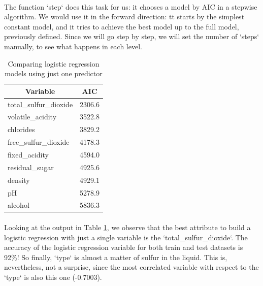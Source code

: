\documentclass[10pt]{article}
\begin{document}
\paragraph*{}
The function `step` does this task for us: it chooses a model by AIC in a stepwise algorithm. We would use it in the forward direction: tt starts by the simplest constant model, and it tries to achieve the best model up to the full model, previously defined. Since we will go step by step, we will set the number of `steps` manually, to see what happens in each level.

\begin{table}[H]
	\centering
	\begin{tabular}{|l|l|}
		\hline
		\multicolumn{1}{|c|}{\textbf{Variable}} & \multicolumn{1}{c|}{\textbf{AIC}} \\ \hline
		total\_sulfur\_dioxide                  & 2306.6                            \\ \hline
		volatile\_acidity                       & 3522.8                            \\ \hline
		chlorides                               & 3829.2                            \\ \hline
		free\_sulfur\_dioxide                   & 4178.3                            \\ \hline
		fixed\_acidity                          & 4594.0                            \\ \hline
		residual\_sugar                         & 4925.6                            \\ \hline
		density                                 & 4929.1                            \\ \hline
		pH                                      & 5278.9                            \\ \hline
		alcohol                                 & 5836.3                            \\ \hline
	\end{tabular}
		\caption{Comparing logistic regression models using just one predictor}
		\label{table:one-predictor}
\end{table}

\paragraph*{}
Looking at the output in Table \ref{table:one-predictor}, we observe that the best attribute to build a logistic regression with just a single variable is the `total\_sulfur\_dioxide`. The accuracy of the logistic regression variable for both train and test datasets is 92\%! So finally, `type` is almost a matter of sulfur in the liquid. This is, nevertheless, not a surprise, since the most correlated variable with respect to the `type` is also this one (-0.7003).
\end{document}
